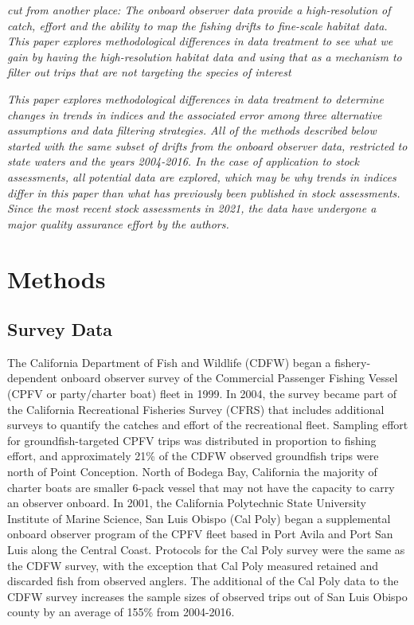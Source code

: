 \documentclass[
  authoryear,
  preprint,
  3p]{elsarticle}
\begin{document}
\emph{cut from another place: The onboard observer data provide a
high-resolution of catch, effort and the ability to map the fishing
drifts to fine-scale habitat data. This paper explores methodological
differences in data treatment to see what we gain by having the
high-resolution habitat data and using that as a mechanism to filter out
trips that are not targeting the species of interest}

\emph{This paper explores methodological differences in data treatment
to determine changes in trends in indices and the associated error among
three alternative assumptions and data filtering strategies. All of the
methods described below started with the same subset of drifts from the
onboard observer data, restricted to state waters and the years
2004-2016. In the case of application to stock assessments, all
potential data are explored, which may be why trends in indices differ
in this paper than what has previously been published in stock
assessments. Since the most recent stock assessments in 2021, the data
have undergone a major quality assurance effort by the authors.}

\hypertarget{methods}{%
\section{Methods}\label{methods}}

\hypertarget{survey-data}{%
\subsection{Survey Data}\label{survey-data}}

The California Department of Fish and Wildlife (CDFW) began a
fishery-dependent onboard observer survey of the Commercial Passenger
Fishing Vessel (CPFV or party/charter boat) fleet in 1999. In 2004, the
survey became part of the California Recreational Fisheries Survey
(CFRS) that includes additional surveys to quantify the catches and
effort of the recreational fleet. Sampling effort for
groundfish-targeted CPFV trips was distributed in proportion to fishing
effort, and approximately 21\% of the CDFW observed groundfish trips
were north of Point Conception. North of Bodega Bay, California the
majority of charter boats are smaller 6-pack vessel that may not have
the capacity to carry an observer onboard. In 2001, the California
Polytechnic State University Institute of Marine Science, San Luis
Obispo (Cal Poly) began a supplemental onboard observer program of the
CPFV fleet based in Port Avila and Port San Luis along the Central
Coast. Protocols for the Cal Poly survey were the same as the CDFW
survey, with the exception that Cal Poly measured retained and discarded
fish from observed anglers. The additional of the Cal Poly data to the
CDFW survey increases the sample sizes of observed trips out of San Luis
Obispo county by an average of 155\% from 2004-2016.
\end{document}

